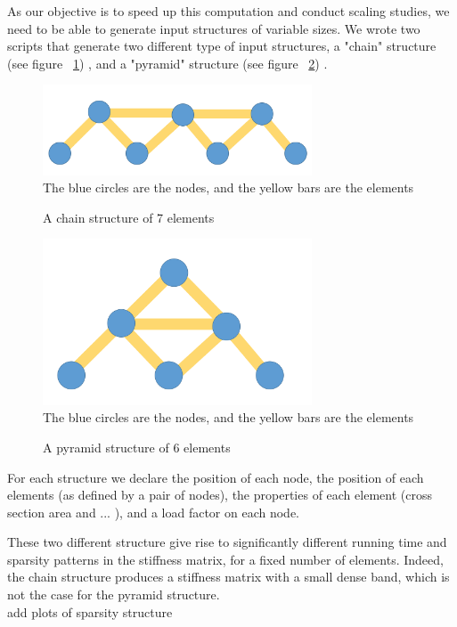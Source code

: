 \documentclass[11pt]{article}
\begin{document}
As our objective is to speed up this computation and conduct scaling studies, we need to be able to generate input structures of variable sizes.
We wrote two scripts that generate two different type of input structures, a "chain" structure (see figure ~\ref{fig:chain}) , and a "pyramid" structure (see figure ~\ref{fig:pyramid}) .


\begin{figure}[h]
\begin{center}

\caption{A chain structure of 7 elements}
\includegraphics[width=8cm]{chain}
\label{fig:chain}
\\
The blue circles are the nodes, and the yellow bars are the elements
\end{center}

\end{figure}


\begin{figure}[h]
\begin{center}

\caption{A pyramid structure of 6 elements}
\includegraphics[width=8cm]{pyramid}
\label{fig:pyramid}
\\
The blue circles are the nodes, and the yellow bars are the elements
\end{center}

\end{figure}



For each structure we declare the position of each node, the position of each elements (as defined by a pair of nodes), the properties of each element (cross section area and ... ), and a load factor on each node.

These two different structure give rise to significantly different running time and sparsity patterns in the stiffness matrix, for a fixed number of elements. Indeed, the chain structure produces a stiffness matrix with a small dense band, which is not the case for the pyramid structure.
\\
add plots of sparsity structure
\end{document}
